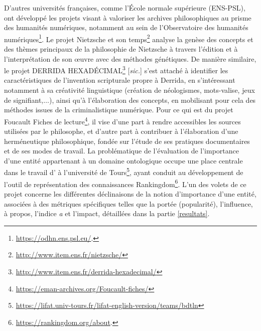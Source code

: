 D'autres universités françaises, comme l'École normale supérieure (\textsc{ENS-PSL}), ont développé les projets visant à valoriser les archives philosophiques au prisme des humanités numériques, notamment au sein de l'Observatoire des humanités numériques\footnote{\url{https://odhn.ens.psl.eu/}.}. Le projet \og{}Nietzsche et son temps\fg{}\footnote{\url{http://www.item.ens.fr/nietzsche/}} analyse la genèse des concepts et des thèmes principaux de la philosophie de Nietzsche à travers l'édition et à l’interprétation de son \oe{}uvre avec des méthodes génétiques. De manière similaire, le projet \og{}DERRIDA HEXADÉCIMAL\fg{}\footnote{\url{http://www.item.ens.fr/derrida-hexadecimal/}} [\textit{sic.}] s'est attaché à identifier les caractéristiques de l'invention scripturale propre à Derrida, en s'intéressant notamment à sa créativité linguistique (création de néologismes, mots-valise, jeux de signifiant,$\dots$), ainsi qu'à l'élaboration des concepts, en mobilisant pour cela des méthodes issues de la criminalistique numérique. Pour ce qui est du projet \og{}Foucault Fiches de lecture\fg{}\footnote{\url{https://eman-archives.org/Foucault-fiches/}}, il vise d'une part à rendre accessibles les sources utilisées par le philosophe, et d'autre part à contribuer à l'élaboration d'une herméneutique philosophique, fondée sur l'étude de ses pratiques documentaires et de ses modes de travail. La problématique de l'évaluation de l'importance d'une entité appartenant à un domaine ontologique occupe une place centrale dans le travail d'\citet{abdallah2025rankingdom} à l'université de Tours\footnote{\url{https://lifat.univ-tours.fr/lifat-english-version/teams/bdtln}}, ayant conduit au développement de l'outil de représentation des connaissances Rankingdom\footnote{\url{https://rankingdom.org/about}.}. L'un des volets de ce projet concerne les différentes déclinaisons de la notion d'importance d'une entité, associées à des métriques spécifiques telles que la portée (popularité), l'influence, \og{}à propos\fg{}, l'indice \textit{a} et l'impact, détaillées dans la partie \ref{resultats}. 

